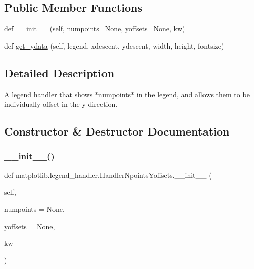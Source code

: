 \subsection*{Public Member Functions}
\begin{DoxyCompactItemize}
\item 
def \hyperlink{classmatplotlib_1_1legend__handler_1_1HandlerNpointsYoffsets_abe2630b907ab5e6221615f9f0f3973fb}{\+\_\+\+\_\+init\+\_\+\+\_\+} (self, numpoints=None, yoffsets=None, kw)
\item 
def \hyperlink{classmatplotlib_1_1legend__handler_1_1HandlerNpointsYoffsets_a4ec3e1afd63ed47a405ec36dc1205deb}{get\+\_\+ydata} (self, legend, xdescent, ydescent, width, height, fontsize)
\end{DoxyCompactItemize}


\subsection{Detailed Description}
\begin{DoxyVerb}A legend handler that shows *numpoints* in the legend, and allows them to
be individually offset in the y-direction.
\end{DoxyVerb}
 

\subsection{Constructor \& Destructor Documentation}
\mbox{\label{classmatplotlib_1_1legend__handler_1_1HandlerNpointsYoffsets_abe2630b907ab5e6221615f9f0f3973fb}} 
\subsubsection{\texorpdfstring{\+\_\+\+\_\+init\+\_\+\+\_\+()}{\_\_init\_\_()}}
{\footnotesize\ttfamily def matplotlib.\+legend\+\_\+handler.\+Handler\+Npoints\+Yoffsets.\+\_\+\+\_\+init\+\_\+\+\_\+ (\begin{DoxyParamCaption}\item[{}]{self,  }\item[{}]{numpoints = {\ttfamily None},  }\item[{}]{yoffsets = {\ttfamily None},  }\item[{}]{kw }\end{DoxyParamCaption})}

